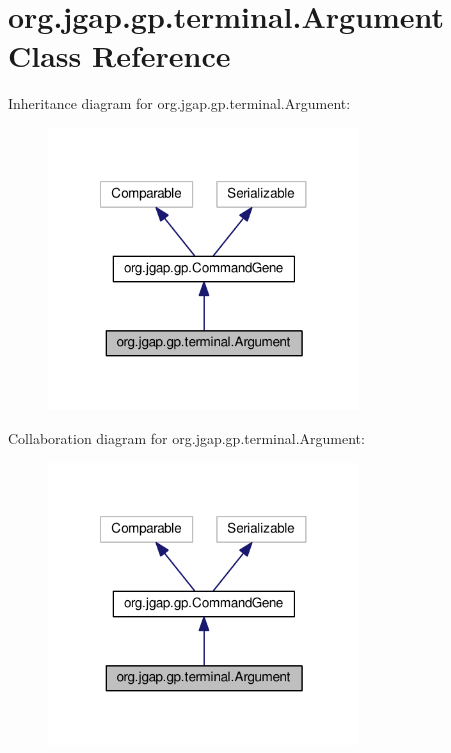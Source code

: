 \hypertarget{classorg_1_1jgap_1_1gp_1_1terminal_1_1_argument}{\section{org.\-jgap.\-gp.\-terminal.\-Argument Class Reference}
\label{classorg_1_1jgap_1_1gp_1_1terminal_1_1_argument}
}


Inheritance diagram for org.\-jgap.\-gp.\-terminal.\-Argument\-:
\nopagebreak
\begin{figure}[H]
\begin{center}
\leavevmode
\includegraphics[width=233pt]{classorg_1_1jgap_1_1gp_1_1terminal_1_1_argument__inherit__graph}
\end{center}
\end{figure}


Collaboration diagram for org.\-jgap.\-gp.\-terminal.\-Argument\-:
\nopagebreak
\begin{figure}[H]
\begin{center}
\leavevmode
\includegraphics[width=233pt]{classorg_1_1jgap_1_1gp_1_1terminal_1_1_argument__coll__graph}
\end{center}
\end{figure}
